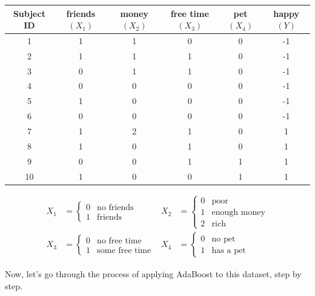 {\small
\begin{center}
\begin{tabular}{cccccc}
\toprule
Subject ID & friends $(X_1)$ & money $(X_2)$ & free time $(X_3)$ & pet $(X_4)$ & happy $(Y)$ \\
\midrule
1 & 1 & 1 & 0 & 0 & -1 \\
2 & 1 & 1 & 1 & 0 & -1 \\
3 & 0 & 1 & 1 & 0 & -1 \\
4 & 0 & 0 & 0 & 0 & -1 \\
5 & 1 & 0 & 0 & 0 & -1 \\
6 & 0 & 0 & 0 & 0 & -1 \\
\midrule
7 & 1 & 2 & 1 & 0 & 1 \\
8 & 1 & 0 & 1 & 0 & 1 \\
9 & 0 & 0 & 1 & 1 & 1 \\
10 & 1 & 0 & 0 & 1 & 1 \\
\bottomrule
\end{tabular}

\begin{align*}
	X_1 &= \left\{ \begin{array}{cl} 0 & \text{no friends} \\ 1 & \text{friends} \end{array} \right.
	&
	X_2 &= \left\{ \begin{array}{cl} 0 & \text{poor} \\ 1 & \text{enough money} \\ 2 & \text{rich} \end{array} \right. \\
	X_3 &= \left\{ \begin{array}{cl} 0 & \text{no free time} \\ 1 & \text{some free time} \end{array} \right.
	&
	X_4 &= \left\{ \begin{array}{cl} 0 & \text{no pet} \\ 1 & \text{has a pet} \end{array} \right.
\end{align*}
\end{center}
}
\vspace{3mm}

\noindent Now, let's go through the process of applying AdaBoost to this dataset, step by step. 

